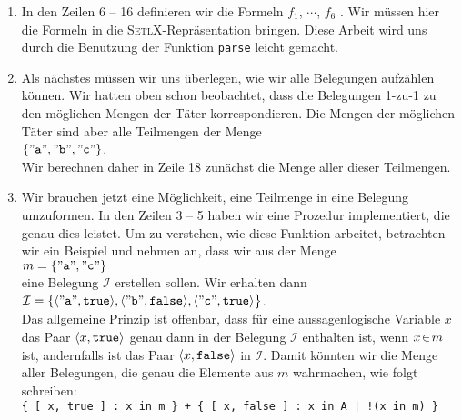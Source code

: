 \begin{enumerate}
\item In den Zeilen 6 -- 16 definieren wir die Formeln $f_1$, $\cdots$, $f_6$      .
      Wir m\"{u}ssen hier die Formeln in die \textsc{SetlX}-Repr\"{a}sentation bringen.
      Diese Arbeit wird uns durch die Benutzung der Funktion \texttt{parse} leicht gemacht.
\item Als n\"{a}chstes m\"{u}ssen wir uns \"{u}berlegen, wie wir alle Belegungen aufz\"{a}hlen k\"{o}nnen. 
      Wir hatten oben schon beobachtet, dass die Belegungen 1-zu-1 zu den m\"{o}glichen Mengen der T\"{a}ter
      korrespondieren.  Die Mengen der m\"{o}glichen T\"{a}ter sind aber alle Teilmengen der Menge
      \\[0.2cm]
      \hspace*{1.3cm}
      $\{ \squote{a}, \squote{b}, \squote{c} \}$. 
      \\[0.2cm]
      Wir berechnen daher in Zeile 18 zun\"{a}chst die Menge aller dieser Teilmengen.
\item Wir brauchen jetzt eine M\"{o}glichkeit, eine Teilmenge in eine Belegung umzuformen.
      In den Zeilen 3 -- 5 haben wir eine Prozedur implementiert, die genau dies
      leistet.  Um zu verstehen, wie diese Funktion arbeitet, betrachten wir ein Beispiel
      und nehmen an, dass wir aus der Menge \\[0.2cm]
      \hspace*{1.3cm} $m = \{\squote{a}, \squote{c} \}$ \\[0.2cm]
      eine Belegung $\mathcal{I}$ erstellen sollen.  Wir erhalten dann \\[0.2cm]
      \hspace*{1.3cm} 
      $\mathcal{I} = \{ \pair(\squote{a},\mathtt{true}), 
                        \pair(\squote{b},\mathtt{false}),
                        \pair(\squote{c},\mathtt{true}) 
       \bigr\}
      $. 
      \\[0.2cm]
      Das allgemeine Prinzip ist offenbar, dass f\"{u}r eine aussagenlogische Variable
      $x$ das Paar $\pair(x,\mathtt{true})$ genau dann in der Belegung $\mathcal{I}$
      enthalten ist, wenn $x \!\in\! m$ ist, andernfalls ist das Paar $\pair(x,\mathtt{false})$
      in $\mathcal{I}$.  Damit k\"{o}nnten wir die Menge aller Belegungen, die genau die
      Elemente aus $m$ wahrmachen, wie folgt schreiben:
      \\[0.2cm]
      \hspace*{1.3cm}      
      \texttt{\{ [ x, true ] : x in m \} + \{ [ x, false ] : x in A | !(x in m) \}}

\end{enumerate}
